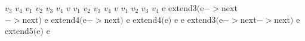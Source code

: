 $v_3$%
\stopmpxshipout
\mpxshipout%
$v_4$%
\stopmpxshipout
\mpxshipout%
$v_1$%
\stopmpxshipout
\mpxshipout%
$v_2$%
\stopmpxshipout
\mpxshipout%
$v_3$%
\stopmpxshipout
\mpxshipout%
$v_4$%
\stopmpxshipout
\mpxshipout%
$v$%
\stopmpxshipout
\mpxshipout%
$v_1$%
\stopmpxshipout
\mpxshipout%
$v_2$%
\stopmpxshipout
\mpxshipout%
$v_3$%
\stopmpxshipout
\mpxshipout%
$v_4$%
\stopmpxshipout
\mpxshipout%
$v$%
\stopmpxshipout
\mpxshipout%
$v_1$%
\stopmpxshipout
\mpxshipout%
$v_2$%
\stopmpxshipout
\mpxshipout%
$v_3$%
\stopmpxshipout
\mpxshipout%
$v_4$%
\stopmpxshipout
\mpxshipout%
e%
\stopmpxshipout
\mpxshipout%
extend3$($e$->$next\\$->$next$)$%
\stopmpxshipout
\mpxshipout%
e%
\stopmpxshipout
\mpxshipout%
extend4$($e$->$next$)$%
\stopmpxshipout
\mpxshipout%
e%
\stopmpxshipout
\mpxshipout%
extend4$($e$)$%
\stopmpxshipout
\mpxshipout%
e%
\stopmpxshipout
\mpxshipout%
e%
\stopmpxshipout
\mpxshipout%
extend3$($e$->$next$->$next$)$%
\stopmpxshipout
\mpxshipout%
e%
\stopmpxshipout
\mpxshipout%
extend5$($e$)$%
\stopmpxshipout
\mpxshipout%
e%
\stopmpxshipout

